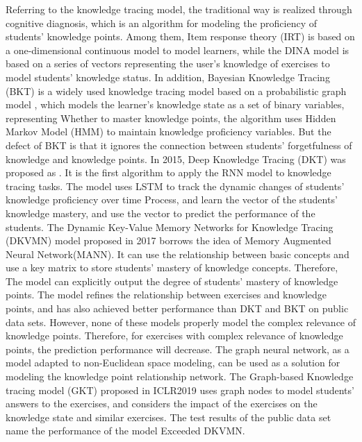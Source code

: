 Referring to the knowledge tracing model, the traditional way is realized through cognitive diagnosis, which is an algorithm for modeling the proficiency of students' knowledge points. Among them, Item response theory (IRT)\cite{embretson2013item} is based on a one-dimensional continuous model to model learners, while the DINA model is based on a series of vectors representing the user's knowledge of exercises to model students' knowledge status\cite{de2009dina}. In addition, Bayesian Knowledge Tracing (BKT) is a widely used knowledge tracing model based on a probabilistic graph model \cite{yudelson2013individualized}, which models the learner's knowledge state as a set of binary variables, representing Whether to master knowledge points, the algorithm uses Hidden Markov Model (HMM) to maintain knowledge proficiency variables. But the defect of BKT is that it ignores the connection between students' forgetfulness of knowledge and knowledge points. In 2015, Deep Knowledge Tracing (DKT) was proposed as \cite{piech2015deep}. It is the first algorithm to apply the RNN model to knowledge tracing tasks. The model uses LSTM to track the dynamic changes of students' knowledge proficiency over time Process, and learn the vector of the students' knowledge mastery, and use the vector to predict the performance of the students. The Dynamic Key-Value Memory Networks for Knowledge Tracing (DKVMN)\cite{zhang2017dynamic} model proposed in 2017 borrows the idea of Memory Augmented Neural Network(MANN)\cite{santoro2016meta}. It can use the relationship between basic concepts and use a key matrix to store students' mastery of knowledge concepts. Therefore, The model can explicitly output the degree of students' mastery of knowledge points. The model refines the relationship between exercises and knowledge points, and has also achieved better performance than DKT and BKT on public data sets. However, none of these models properly model the complex relevance of knowledge points. Therefore, for exercises with complex relevance of knowledge points, the prediction performance will decrease. The graph neural network, as a model adapted to non-Euclidean space modeling, can be used as a solution for modeling the knowledge point relationship network. The Graph-based Knowledge tracing model (GKT)\cite{nakagawa2019graph} proposed in ICLR2019 uses graph nodes to model students' answers to the exercises, and considers the impact of the exercises on the knowledge state and similar exercises. The test results of the public data set name the performance of the model Exceeded DKVMN.


